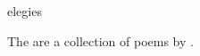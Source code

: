 \documentclass{stex}
\begin{document}
\begin{smodule}{elegies}
\begin{sparagraph}[style=symdoc]
The  are a collection of poems by .
\end{sparagraph}
\end{smodule}
\end{document}
